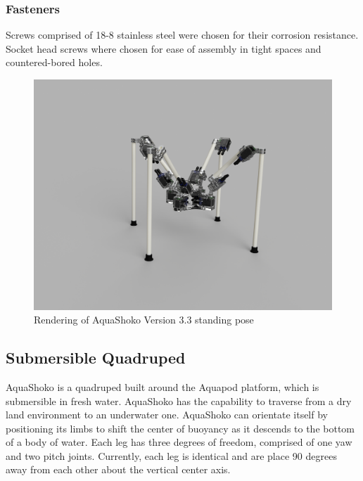 \subsubsection{Fasteners}
Screws comprised of 18-8 stainless steel were chosen for their corrosion resistance. Socket head screws where chosen for ease of assembly in tight spaces and countered-bored holes.

\begin{figure}
\centering
\includegraphics[width=1.0\columnwidth]{./img/aquaShoko-v3dot3-render-standPose.png}
\caption{Rendering of AquaShoko Version 3.3 standing pose}
\label{fig:shoko stand pose}
\end{figure}


\subsection{Submersible Quadruped}
AquaShoko is a quadruped built around the Aquapod platform, which is submersible in fresh water. AquaShoko has the capability to traverse from a dry land environment to an underwater one. AquaShoko can orientate itself by positioning its limbs to shift the center of buoyancy as it descends to the bottom of a body of water. Each leg has three degrees of freedom, comprised of one yaw and two pitch joints. Currently, each leg is identical and are place 90 degrees away from each other about the vertical center axis. 



